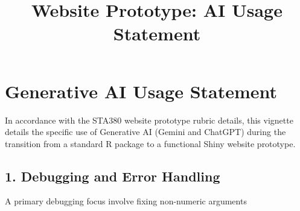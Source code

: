 \documentclass[
]{article}
\title{Website Prototype: AI Usage Statement}
\author{}
\date{\vspace{-2.5em}}
\begin{document}
\maketitle

\section{Generative AI Usage
Statement}\label{generative-ai-usage-statement}

In accordance with the STA380 website prototype rubric details, this
vignette details the specific use of Generative AI (Gemini and ChatGPT)
during the transition from a standard R package to a functional Shiny
website prototype.

\subsection{1. Debugging and Error
Handling}\label{debugging-and-error-handling}

A primary debugging focus involve fixing non-numeric arguments
\end{document}
